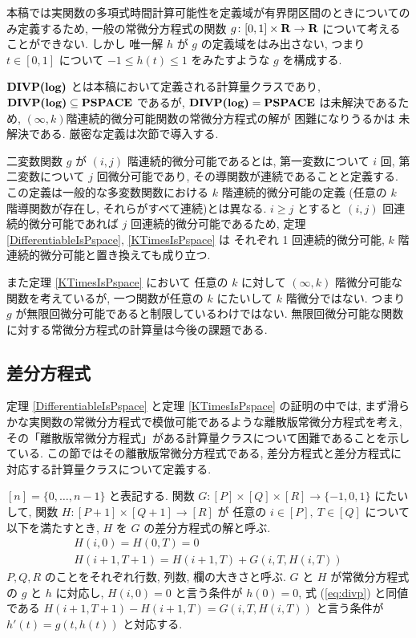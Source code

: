  本稿では実関数の多項式時間計算可能性を定義域が有界閉区間のときについてのみ定義するため,
 一般の常微分方程式の関数 $g \colon [0,1] \times \mathbf R \to \mathbf R$ 
 について考えることができない.
 しかし 唯一解 $h$ が $g$ の定義域をはみ出さない, つまり
 $t \in [0, 1]$ について $-1 \le h(t) \le 1$ をみたすような $g$ を構成する.

 $\text{\bf DIVP(log)}$ とは本稿において定義される計算量クラスであり,
 $\text{\bf DIVP(log)} \subseteq {\bf PSPACE}$ であるが, $\text{\bf DIVP(log)} = {\bf PSPACE}$ は未解決であるため,
 $(\infty, k)$階連続的微分可能関数の常微分方程式の解が \PSPACE 困難になりうるかは
 未解決である.
 厳密な定義は次節で導入する.

 二変数関数 $g$ が $(i, j)$ 階連続的微分可能であるとは,
 第一変数について $i$ 回, 第二変数について $j$ 回微分可能であり,
 その導関数が連続であることと定義する.
 この定義は一般的な多変数関数における $k$ 階連続的微分可能の定義
 (任意の $k$ 階導関数が存在し, それらがすべて連続)とは異なる.
 $i \ge j$ とすると $(i,j)$ 回連続的微分可能であれば $j$ 回連続的微分可能であるため,
 定理 \ref{DifferentiableIsPspace}, \ref{KTimesIsPspace} は
 それぞれ 1 回連続的微分可能, $k$ 階連続的微分可能と置き換えても成り立つ.

 また定理 \ref{KTimesIsPspace} において
 任意の $k$ に対して $(\infty, k)$ 階微分可能な関数を考えているが,
 一つ関数が任意の $k$ にたいして $k$ 階微分ではない.
 つまり $g$ が無限回微分可能であると制限しているわけではない. 
 無限回微分可能な関数に対する常微分方程式の計算量は今後の課題である.





\subsection{差分方程式}
\label{section:divp}

定理 \ref{DifferentiableIsPspace} と定理 \ref{KTimesIsPspace} の証明の中では,
まず滑らかな実関数の常微分方程式で模倣可能であるような離散版常微分方程式を考え, 
その「離散版常微分方程式」がある計算量クラスについて困難であることを示している.
この節ではその離散版常微分方程式である, 
差分方程式と差分方程式に対応する計算量クラスについて定義する.



$[n] = \{0, \dots , n-1\}$ と表記する.
関数 $G \colon [P] \times [Q] \times [R] \to \{-1, 0, 1\}$ にたいして,
関数 $H \colon [P + 1] \times [Q+1] \to [R]$ が
任意の $i \in [P],\ T \in [Q]$ について以下を満たすとき,
$H$ を $G$ の差分方程式の解と呼ぶ.
\begin{gather}
   H(i, 0) = H(0, T) = 0 
\\
   H(i + 1, T + 1) = H(i+1, T) + G(i, T, H(i, T))  \label{eq:divp}
\end{gather}
$P, Q, R$ のことをそれぞれ行数, 列数, 欄の大きさと呼ぶ.
$G$ と $H$ が常微分方程式の $g$ と $h$ に対応し,
$H(i, 0) = 0$ と言う条件が $h(0) = 0$,
式 (\ref{eq:divp}) と同値である $H(i + 1, T + 1) - H(i+1, T) = G(i, T, H(i, T))$
と言う条件が $h'(t) = g(t, h(t))$ と対応する.

